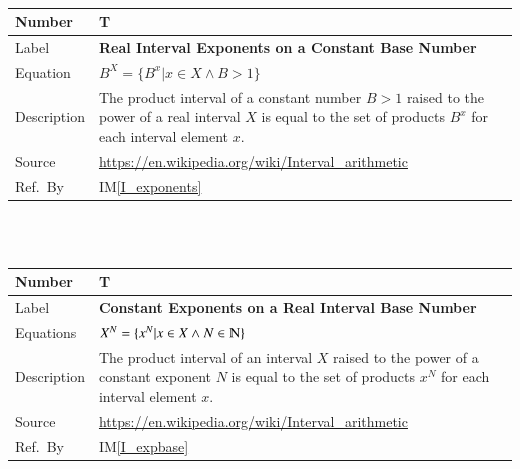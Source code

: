 \documentclass[12pt]{article}
\newcommand{\colAwidth}{0.13\textwidth}
\newcommand{\colBwidth}{0.82\textwidth}
\newcounter{theorynum} %
\newcommand{\iref}[1]{IM\ref{#1}}
\begin{document}
~\newline

\noindent
\begin{minipage}{\textwidth}
	\renewcommand*{\arraystretch}{1.5}
	\begin{tabular}{| p{\colAwidth} | p{\colBwidth}|}
		\hline
		\rowcolor[gray]{0.9}
		Number& T{theorynum}\thetheorynum 
		\label{T_exponents}\\
		\hline
		Label&\bf Real Interval Exponents on a Constant Base Number\\
		\hline
		Equation&  $B^X = \{B^x | x \in X \wedge B > 1\}$\\
		\hline
		Description & The product interval of a constant number $B > 1$ raised 
		to the power of a real interval $X$ is equal to the set of products 
		$B^x$ for each interval element $x$.\\
		\hline
		Source & \url{https://en.wikipedia.org/wiki/Interval_arithmetic}\\
		\hline
		Ref.\ By & \iref{I_exponents}\\
		\hline
	\end{tabular}
\end{minipage}\\

~\newline

\noindent
\begin{minipage}{\textwidth}
	\renewcommand*{\arraystretch}{1.5}
	\begin{tabular}{| p{\colAwidth} | p{\colBwidth}|}
		\hline
		\rowcolor[gray]{0.9}
		Number& T{theorynum}\thetheorynum 
		\label{T_expbase}\\
		\hline
		Label&\bf Constant Exponents on a Real Interval Base 
		Number\\
		\hline
		Equations &  $X^N = \{x^N | x \in X \wedge N \in \varmathbb{N}\}$
		\\
		\hline
		Description & The product interval of an interval $X$ raised 
		to the power of a constant exponent $N$ is equal to the set of products 
		$x^N$ for each interval element $x$.\\
		\hline
		Source & \url{https://en.wikipedia.org/wiki/Interval_arithmetic}\\
		\hline
		Ref.\ By & \iref{I_expbase}\\
		\hline
	\end{tabular}
\end{minipage}\\
\end{document}
